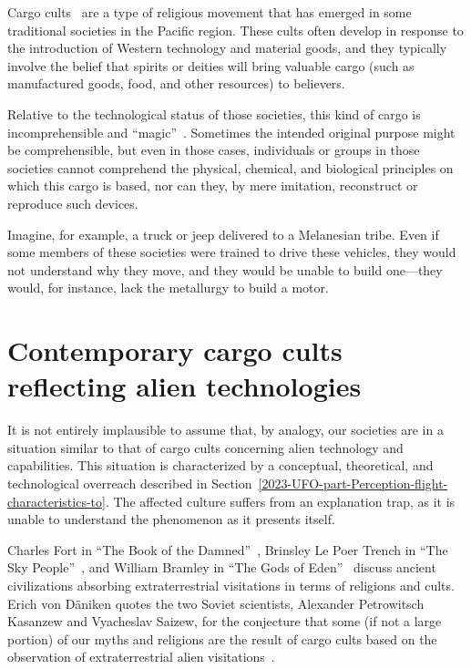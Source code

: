 Cargo cults~\cite{Worsley2009may,Lindstrom_2019} are a type of religious movement that has emerged in some traditional societies in the Pacific region.
These cults often develop in response to the introduction of Western technology and material goods, and they typically involve the belief that spirits or deities will bring valuable cargo
(such as manufactured goods, food, and other resources) to believers.

Relative to the technological status of those societies, this kind of cargo is incomprehensible and ``magic''~\cite{Clarke2000Jan}.
Sometimes the intended original purpose might be comprehensible, but even in those cases, individuals or groups in those societies
cannot comprehend the physical, chemical, and biological principles on which this cargo is based, nor can they, by mere imitation, reconstruct or reproduce such devices.

Imagine, for example, a truck or jeep delivered to a Melanesian tribe.
Even if some members of these societies were trained to drive these vehicles, they would not understand why they move,
and they would be unable to build one---they would, for instance, lack the metallurgy to build a motor.



\section{Contemporary cargo cults reflecting alien technologies}
\label{2023-UFO-part-Speculation-cargo-cults-ldl} %

It is not entirely implausible to assume that, by analogy, our societies are in a situation similar to that of cargo cults concerning alien technology and capabilities. This situation is characterized by a conceptual, theoretical, and technological overreach  described in Section~\ref{2023-UFO-part-Perception-flight-characteristics-to}. The affected culture suffers from an explanation trap, as it is unable to understand the phenomenon as it presents itself.

Charles Fort in ``The Book of the Damned''~\cite{FortBotD}, Brinsley Le Poer Trench in ``The Sky People''~\cite{lePoerTrench1961Jan},
and William Bramley in ``The Gods of Eden''~\cite{Bramley1993Mar} discuss ancient civilizations absorbing
extraterrestrial visitations in terms of religions and cults. Erich von D\"aniken quotes the two Soviet scientists,
Alexander Petrowitsch Kasanzew and Vyacheslav Saizew,
for the conjecture that some (if not a large portion) of our myths and religions are the result of cargo cults based on the
observation of extraterrestrial alien visitations~\cite{vonDaeniken1970}.

